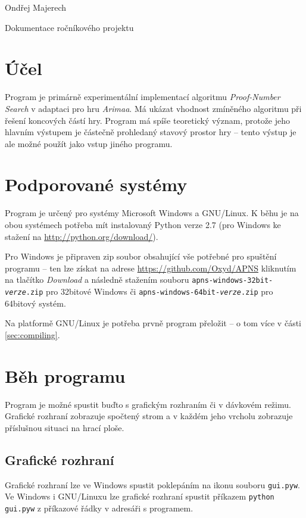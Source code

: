 \documentclass{article}
\begin{document}
\begin{flushright}
  Ondřej Majerech
\end{flushright}
\begin{center}
  \Huge Dokumentace ročníkového projektu
\end{center}

\section{Účel}
Program je primárně experimentální implementací algoritmu \emph{Proof-Number
Search} v adaptaci pro hru \emph{Arimaa}.
Má ukázat vhodnost zmíněného algoritmu při řešení koncových částí hry. Program
má spíše teoretický význam, protože jeho
hlavním výstupem je částečně prohledaný stavový prostor hry -- tento výstup je
ale možné použít jako vstup jiného
programu.

\section{Podporované systémy}
Program je určený pro systémy Microsoft Windows a GNU/Linux. K běhu je na obou
systémech potřeba mít instalovaný
Python verze 2.7 (pro Windows ke stažení na \url{http://python.org/download/}). 

Pro Windows je připraven zip soubor obsahující vše potřebné pro spuštění
programu -- ten lze získat na adrese
\url{https://github.com/Oxyd/APNS} kliknutím na tlačítko \emph{Download} a
následně stažením souboru
\texttt{apns-windows-32bit-\textit{verze}.zip} pro 32bitové Windows či
\texttt{apns-windows-64bit-\textit{verze}.zip} pro 
64bitový systém.

Na platformě GNU/Linux je potřeba prvně program přeložit -- o tom více v části
\ref{sec:compiling}.

\section{Běh programu}
\label{sec:running}
Program je možné spustit buďto s grafickým rozhraním či v dávkovém režimu.
Grafické rozhraní zobrazuje spočtený strom a v každém jeho vrcholu zobrazuje 
příslušnou situaci na hrací ploše. 

\subsection{Grafické rozhraní}
Grafické rozhraní lze ve Windows spustit poklepáním na ikonu souboru
\texttt{gui.pyw}. Ve Windows i GNU/Linuxu lze grafické rozhraní spustit příkazem 
\texttt{python gui.pyw} z příkazové řádky v adresáři s programem.
\end{document}
